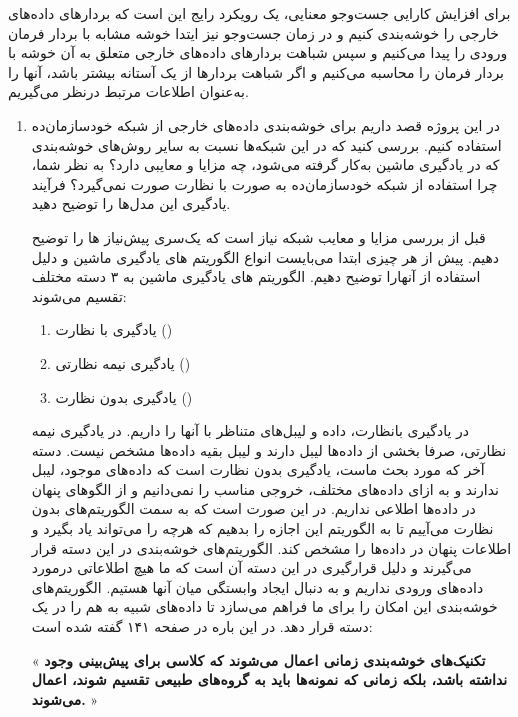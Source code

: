برای افزایش کارایی جست‌و‌جو معنایی، یک رویکرد رایج این است که بردار‌های داده‌های خارجی را خوشه‌بندی کنیم و در زمان جست‌و‌جو نیز ایتدا خوشه مشابه با بردار فرمان ورودی را پیدا می‌کنیم و سپس شباهت بردار‌های داده‌های خارجی متعلق به آن خوشه با بردار فرمان را محاسبه می‌کنیم و اگر شباهت بردار‌ها از یک آستانه بیشتر باشد، آنها را به‌عنوان اطلاعات مرتبط درنظر می‌گیریم.

\begin{enumerate}
	\item در این پروژه قصد داریم برای خوشه‌بندی داده‌های خارجی از شبکه خود‌سازمان‌ده استفاده کنیم. بررسی کنید که در این شبکه‌ها نسبت به سایر روش‌های خوشه‌بندی که در یادگیری ماشین به‌کار گرفته می‌شود، چه مزایا و معایبی دارد؟ به نظر شما، چرا استفاده از شبکه خودسازمان‌ده به صورت با نظارت صورت نمی‌گیرد؟ فرآیند یادگیری این مدل‌ها را توضیح دهید.
	
	\begin{qsolve}
قبل از بررسی مزایا و معایب شبکه  نیاز است که یک‌سری پیش‌نیاز ها را توضیح دهیم. پیش از هر چیزی ابتدا می‌بایست انواع الگوریتم های یادگیری ماشین و دلیل استفاده از آنها‌را توضیح دهیم. الگوریتم های یادگیری ماشین به ۳ دسته مختلف تقسیم می‌شوند:

	\begin{enumerate}
		\item یادگیری با نظارت ()
		\item یادگیری نیمه نظارتی ()
		\item  یادگیری بدون نظارت ()
	\end{enumerate}
در یادگیری بانظارت، داده و لیبل‌های متناظر با آنها را داریم. در یادگیری نیمه نظارتی، صرفا بخشی از داده‌ها لیبل دارند و لیبل بقیه داده‌ها مشخص نیست. دسته آخر که مورد بحث ماست، یادگیری بدون نظارت است که داده‌های موجود، لیبل ندارند و به ازای داده‌های مختلف، خروجی مناسب را نمی‌دانیم و از الگو‌های پنهان در داده‌ها اطلاعی نداریم. در این صورت است که به سمت الگوریتم‌های بدون نظارت می‌آییم تا به الگوریتم این اجازه را بدهیم که هرچه را می‌تواند یاد بگیرد و اطلاعات پنهان در داده‌ها را مشخص کند. الگوریتم‌های خوشه‌بندی در این دسته قرار می‌گیرند و دلیل قرارگیری در این دسته آن است که ما هیچ اطلاعاتی درمورد داده‌های ورودی نداریم و به دنبال ایجاد وابستگی میان آنها هستیم. الگوریتم‌های خوشه‌بندی این امکان را برای ما فراهم می‌سازد تا داده‌های شبیه به هم را در یک دسته قرار دهد. در این باره در صفحه ۱۴۱ \cite{ref1} گفته شده است:

« \textbf{تکنیک‌های خوشه‌بندی زمانی اعمال می‌شوند که کلاسی برای پیش‌بینی وجود نداشته باشد، بلکه زمانی که نمونه‌ها باید به گروه‌های طبیعی تقسیم شوند، اعمال می‌شوند.} »
	

\end{qsolve}
\end{enumerate}
